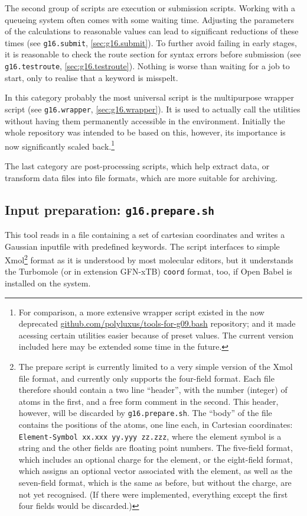 \documentclass[   %
  final,          %
  a4paper         %
]{article}
\begin{document}
The second group of scripts are execution or submission scripts.
Working with a queueing system often comes with some waiting time.
Adjusting the parameters of the calculations to reasonable values
can lead to significant reductions of these times 
(see \lstinline`g16.submit`, \ref{sec:g16.submit}).
To further avoid failing in early stages, it is reasonable to check the route section
for syntax errors before submission (see \lstinline`g16.testroute`, \ref{sec:g16.testroute}).
Nothing is worse than waiting for a job to start, only to realise that a keyword is misspelt.

In this category probably the most universal script is the multipurpose wrapper script
(see \lstinline`g16.wrapper`, \ref{sec:g16.wrapper}). 
It is used to actually call the utilities without having them permanently accessible 
in the environment.
Initially the whole repository was intended to be based on this, 
however, its importance is now significantly scaled back.\footnote{%
  For comparison, a more extensive wrapper script existed in the now deprecated
  \href{https://github.com/polyluxus/tools-for-g09.bash}{github.com/polyluxus/tools-for-g09.bash}
  repository; and it made acessing certain utilities easier because of preset values.
  The current version included here may be extended some time in the future.}

The last category are post-processing scripts, 
which help extract data, or transform data files into file formats,
which are more suitable for archiving.

\subsection{Input preparation: \texorpdfstring{{\lstinline`g16.prepare.sh`}}{g16.prepare.sh}}
\label{sec:g16.prepare}

This tool reads in a file containing a set of cartesian coordinates and
writes a Gaussian inputfile with predefined keywords. 
The script interfaces to simple Xmol\footnote{%
  The prepare script is currently limited to a very simple version of the Xmol file format,
  and currently only supports the four-field format.
  Each file therefore should contain a two line ``header'', 
  with the number (integer) of atoms in the first, 
  and a free form comment in the second.
  This header, however, will be discarded by {\lstinline`g16.prepare.sh`}.
  The ``body'' of the file contains the positions of the atoms, one line each,
  in Cartesian coordinates: \texttt{Element-Symbol xx.xxx yy.yyy zz.zzz},
  where the element symbol is a string and the other fields are floating point numbers.
  The five-field format, which includes an optional charge for the element,
  or the eight-field format, which assigns an optional vector associated with the element,
  as well as the seven-field format, which is the same as before, but without the charge,
  are not yet recognised.
  (If there were implemented, everything except the first four fields would be discarded.)
}
format as it is understood by most molecular editors, 
but it understands the Turbomole (or in extension GFN-xTB) \texttt{coord} format, too,
if Open Babel is installed on the system.
\end{document}

